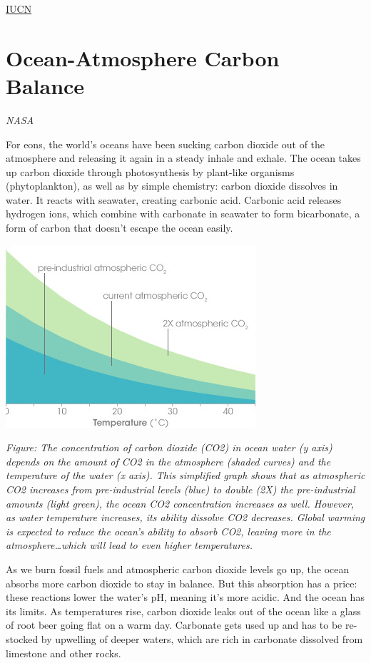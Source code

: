 \documentclass[
]{book}
\begin{document}
\href{https://www.iucn.org/resources/issues-briefs/ocean-warming}{IUCN}

\hypertarget{ocean-atmosphere-carbon-balance}{%
\section{Ocean-Atmosphere Carbon Balance}\label{ocean-atmosphere-carbon-balance}}

\emph{NASA}

For eons, the world's oceans have been sucking carbon dioxide out of the atmosphere and releasing it again in a steady inhale and exhale. The ocean takes up carbon dioxide through photosynthesis by plant-like organisms (phytoplankton), as well as by simple chemistry: carbon dioxide dissolves in water. It reacts with seawater, creating carbonic acid. Carbonic acid releases hydrogen ions, which combine with carbonate in seawater to form bicarbonate, a form of carbon that doesn't escape the ocean easily.

\includegraphics{fig/ocean_carbon_uptake.jpg}

\emph{Figure: The concentration of carbon dioxide (CO2) in ocean water (y axis) depends on the amount of CO2 in the atmosphere (shaded curves) and the temperature of the water (x axis). This simplified graph shows that as atmospheric CO2 increases from pre-industrial levels (blue) to double (2X) the pre-industrial amounts (light green), the ocean CO2 concentration increases as well. However, as water temperature increases, its ability dissolve CO2 decreases. Global warming is expected to reduce the ocean's ability to absorb CO2, leaving more in the atmosphere\ldots which will lead to even higher temperatures.}

As we burn fossil fuels and atmospheric carbon dioxide levels go up, the ocean absorbs more carbon dioxide to stay in balance. But this absorption has a price: these reactions lower the water's pH, meaning it's more acidic. And the ocean has its limits. As temperatures rise, carbon dioxide leaks out of the ocean like a glass of root beer going flat on a warm day. Carbonate gets used up and has to be re-stocked by upwelling of deeper waters, which are rich in carbonate dissolved from limestone and other rocks.
\end{document}
